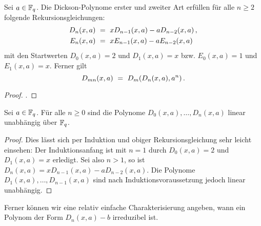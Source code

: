 \begin{proposition}
  \label{satz:dickson_2}
  Sei $a \in \mathbb{F}_q$. Die Dickson-Polynome erster und zweiter Art 
  erfüllen für alle $n\geq 2$ folgende Rekursionsgleichungen:
  \begin{align*}
    D_n(x,a) &\ =\  xD_{n-1}(x,a) - a D_{n-2}(x,a) \,, \\
    E_n(x,a) &\ =\  xE_{n-1}(x,a) - a E_{n-2}(x,a)
  \end{align*}
  mit den Startwerten $D_0(x,a) = 2$ und $D_1(x,a)=x$ bzw.
  $E_0(x,a) = 1$ und $E_1(x,a) = x$. Ferner gilt
  \[ D_{mn}(x,a) \ =\  D_m(D_n(x,a),a^n)\,.\]
\end{proposition}
\begin{proof}
  \autocites[Lemma 2.3, Lemma 2.6 (i)]{lidl1993dickson}.
\end{proof}

\begin{proposition}
  \label{prop:dickson_linear_unabhangig}
  Sei $a \in \mathbb{F}_q$. Für alle $n\geq 0$ sind die Polynome
  $D_0(x,a), \ldots, D_n(x,a)$ linear unabhängig über $\mathbb{F}_q$.
\end{proposition}
\begin{proof}
  Dies lässt sich per Induktion und obiger Rekursionsgleichung
  sehr leicht einsehen: Der Induktionsanfang ist
  mit $n = 1$ durch $D_0(x,a) = 2$ und $D_1(x,a) = x$ erledigt.
  Sei also $n > 1$, so ist $D_n(x,a) = xD_{n-1}(x,a)-aD_{n-2}(x,a)$.
  Die Polynome $D_1(x,a),\ldots,D_{n-1}(x,a)$ sind nach Induktionsvoraussetzung
  jedoch linear unabhängig.
\end{proof}

Ferner können wir eine  relativ einfache Charakterisierung angeben, wann ein
Polynom der Form $D_n(x,a)-b$ irreduzibel ist.


